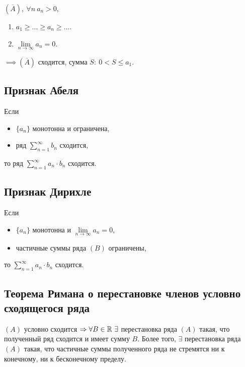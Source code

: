 \begin{theorem}
    $(\overline{A}), \ \forall n \ a_n > 0, $ 
    \begin{enumerate}
        \item $a_1 \geqslant \ldots \geqslant a_n \geqslant \ldots$.
        \item $\underset{n\rightarrow\infty}{\lim} a_n = 0$.
    \end{enumerate}

    $\implies (\overline{A})$ сходится, сумма $S: \ 0 < S \leqslant a_1$.
\end{theorem}

\subsection{Признак Абеля}

\begin{theorem}
    Если \begin{itemize}
        \item $\{a_n\}$ монотонна и ограничена,
        \item ряд $\sum_{n=1}^{\infty} b_n$ сходится,
    \end{itemize}
    то ряд $\sum_{n=1}^{\infty}a_n \cdot b_n$ сходится.
\end{theorem}

\subsection{Признак Дирихле}

\begin{theorem}
    Если \begin{itemize}
        \item $\{a_n\}$ монотонна и $\underset{n\rightarrow\infty}{\lim}a_n = 0$,
        \item частичные суммы ряда $(B)$ ограничены,
    \end{itemize}
    то $\sum_{n=1}^{\infty}a_n \cdot b_n$ сходится.
\end{theorem}

\subsection{Теорема Римана о перестановке членов условно сходящегося ряда}

\begin{theorem}
    $(A)$ условно сходится $\implies \forall B \in \R \ \exists$ перестановка ряда $(A)$ такая, что полученный ряд сходится и имеет сумму $B$. Более того, $\exists$ перестановка ряда $(A)$ такая, что частичные суммы полученного ряда не стремятся ни к конечному, ни к бесконечному пределу.
\end{theorem}

\newpage
